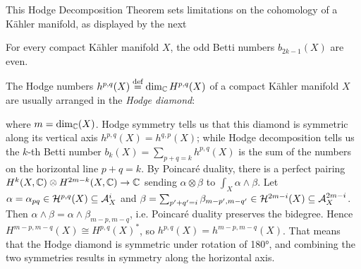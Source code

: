 \documentclass[../main.tex]{subfiles}
\begin{document}
This Hodge Decomposition Theorem sets limitations on the cohomology of a K\"{a}hler manifold, as displayed by the next

\begin{cor}
For every compact K\"{a}hler manifold $X$, the odd Betti numbers $b_{2k-1}(X)$ are even.
\end{cor}

The Hodge numbers $h^{p,q}(X) \stackrel{\text{def}}{=} \dim_{\mathbb{C}} H^{p,q}(X)$ of a compact K\"{a}hler manifold $X$ are usually arranged in the \emph{Hodge diamond}:
\begin{center}
    \label{HODGE_diamond}
\end{center}
    
where $m = \dim_{\mathbb{C}}(X)$.
Hodge symmetry tells us that this diamond is symmetric along its vertical axis $h^{p,q}(X) = h^{q,p}(X)$; while Hodge decomposition tells us the $k$-th Betti number $b_k(X) = \sum_{p+q=k}h^{p,q}(X)$ is the sum of the numbers on the horizontal line $p+q=k$. By Poincaré duality, there is a perfect pairing $H^k(X,\mathbb{C}) \otimes H^{2m-k}(X,\mathbb{C}) \to \mathbb{C}$ sending $\alpha \otimes \beta$ to $\int_X \alpha\wedge \beta$. Let $\alpha = \alpha_{pq} \in \mathcal{H}^{p,q}(X) \subseteq \mathcal{A}^i_X$ and $\beta = \sum_{p^\prime+q^\prime=i} \beta_{m-p^\prime,m-q^\prime} \in \mathcal{H}^{2m-i} (X) \subseteq \mathcal{A}^{2m-i}_X$. Then $\alpha \wedge \beta =\alpha \wedge \beta_{m-p,m-q} $, i.e. Poincaré duality preserves the bidegree. Hence $H^{m-p,m-q}(X) \cong H^{p,q}(X)^*$, so $h^{p,q}(X) = h^{m-p,m-q}(X)$. That means that the Hodge diamond is symmetric under rotation of 180°, and combining the two symmetries results in symmetry along the horizontal axis.
\end{document}
